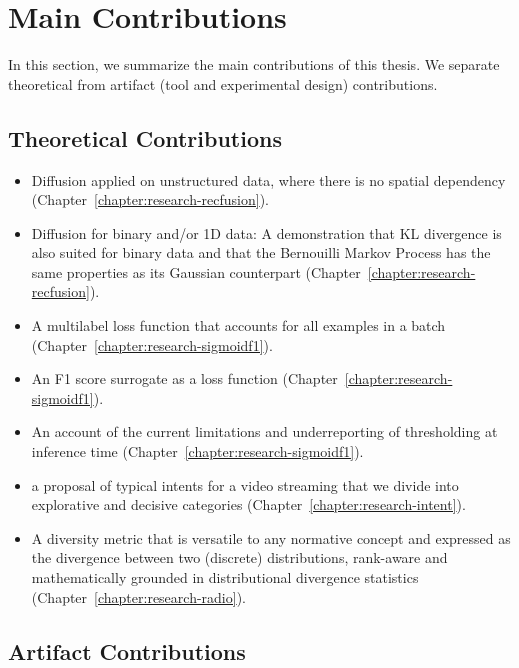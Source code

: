 
\section{Main Contributions}
\label{section:introduction:contributions}

In this section, we summarize the main contributions of this thesis. We separate theoretical from artifact (tool and experimental design) contributions.


\subsection*{Theoretical Contributions}

\begin{itemize}
\item Diffusion applied on unstructured data, where there is no spatial dependency (Chapter~\ref{chapter:research-recfusion}).
\item Diffusion for binary and/or 1D data: A demonstration that KL divergence is also suited for binary data and that the Bernouilli Markov Process has the same properties as its Gaussian counterpart (Chapter~\ref{chapter:research-recfusion}).
\item A multilabel loss function that accounts for all examples in a batch (Chapter~\ref{chapter:research-sigmoidf1}).
\item An F1 score surrogate as a loss function (Chapter~\ref{chapter:research-sigmoidf1}).
\item An account of the current limitations and underreporting of thresholding at inference time (Chapter~\ref{chapter:research-sigmoidf1}).
\item a proposal of typical intents for a video streaming that we divide into explorative and decisive categories (Chapter~\ref{chapter:research-intent}).
\item A diversity metric that is versatile to any normative concept and expressed as the divergence between two (discrete) distributions, rank-aware and mathematically grounded in distributional divergence statistics (Chapter~\ref{chapter:research-radio}).
\end{itemize}

\subsection*{Artifact Contributions}

